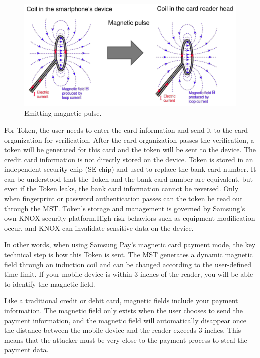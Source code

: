 \documentclass[journal]{IEEEtran}
\begin{document}
\begin{figure}[htbp]
\centerline{\includegraphics[scale=0.18]{Emittingmagneticpulse.png}}
\caption{Emitting magnetic pulse.}
\label{fig}
\end{figure}

For Token, the user needs to enter the card information and send it to the card organization for verification. After the card organization passes the verification, a token will be generated for this card and the token will be sent to the device. The credit card information is not directly stored on the device. Token is stored in an independent security chip (SE chip) and used to replace the bank card number. It can be understood that the Token and the bank card number are equivalent, but even if the Token leaks, the bank card information cannot be reversed. Only when fingerprint or password authentication passes can the token be read out through the MST. Token's storage and management is governed by Samsung's own KNOX security platform.High-risk behaviors such as equipment modification occur, and KNOX can invalidate sensitive data on the device.

In other words, when using Samsung Pay's magnetic card payment mode, the key technical step is how this Token is sent. The MST generates a dynamic magnetic field through an induction coil and can be changed according to the user-defined time limit. If your mobile device is within 3 inches of the reader, you will be able to identify the magnetic field.

Like a traditional credit or debit card, magnetic fields include your payment information. The magnetic field only exists when the user chooses to send the payment information, and the magnetic field will automatically disappear once the distance between the mobile device and the reader exceeds 3 inches. This means that the attacker must be very close to the payment process to steal the payment data.
\end{document}
